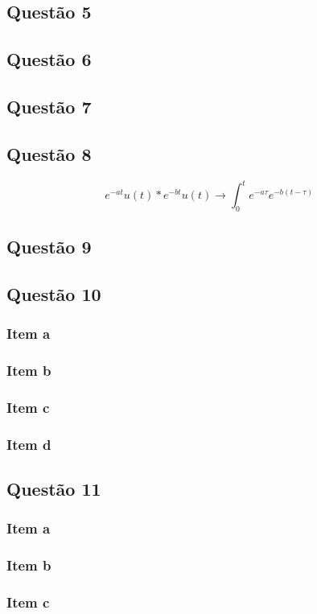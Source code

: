\documentclass[a4paper, 12pt]{article}
\begin{document}
    \subsection{Quest\~{a}o 5}
    \subsection{Quest\~{a}o 6}
    \subsection{Quest\~{a}o 7} 
    \subsection{Quest\~{a}o 8}
    \[ e^{-at}u(t)\ast e^{-bt}u(t) \rightarrow \int_{0}^{t} e^{-a\tau}e^{-b(t-\tau)}\]
    \subsection{Quest\~{a}o 9}
    \subsection{Quest\~{a}o 10}
    \subsubsection{Item a} 
    \subsubsection{Item b} 
    \subsubsection{Item c} 
    \subsubsection{Item d} 
    \subsection{Quest\~{a}o 11}
    \subsubsection{Item a} 
    \subsubsection{Item b} 
    \subsubsection{Item c} 
\end{document}
